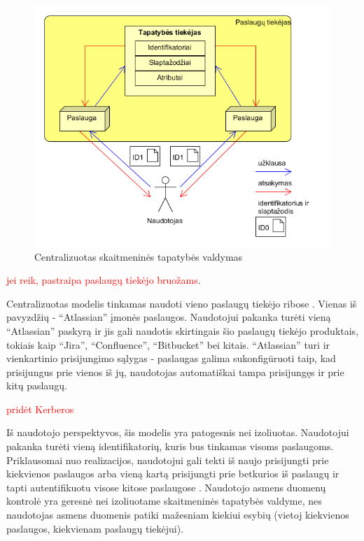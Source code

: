 \begin{figure}[H]
    \centering
    \includegraphics[scale=0.8]{img/centralizedModel}
    \caption{Centralizuotas skaitmeninės tapatybės valdymas \cite{Cao2010}}
    \label{fig:isolatedModel}
\end{figure}

\textcolor{red}{jei reik, pastraipa paslaugų tiekėjo bruožams}.


Centralizuotas modelis tinkamas naudoti vieno paslaugų tiekėjo ribose \cite{Josang2005}. Vienas iš pavyzdžių - 
\enquote{Atlassian} įmonės paslaugos. Naudotojui pakanka turėti vieną \enquote{Atlassian} paskyrą ir jis gali naudotis
skirtingais šio paslaugų tiekėjo produktais, tokiais kaip \enquote{Jira}, \enquote{Confluence}, \enquote{Bitbucket} bei kitais. \enquote{Atlassian}
turi ir vienkartinio prisijungimo sąlygas - paslaugas galima sukonfigūruoti taip, kad prisijungus prie vienos iš jų,
naudotojas automatiškai tampa prisijungęs ir prie kitų paslaugų.

\textcolor{red}{pridėt Kerberos}

 
Iš naudotojo perspektyvos, šis modelis yra patogesnis nei izoliuotas. Naudotojui pakanka turėti vieną identifikatorių,
kuris bus tinkamas visoms paslaugoms. Priklausomai nuo realizacijos, naudotojui gali tekti iš naujo prisijungti prie kiekvienos
paslaugos arba vieną kartą prisijungti prie betkurios iš paslaugų ir tapti autentifikuotu visose kitose paslaugose \cite{Josang2005}. Naudotojo asmens
duomenų kontrolė yra geresnė nei izoliuotame skaitmeninės tapatybės valdyme, nes naudotojas asmens duomenis patiki mažesniam kiekiui esybių
(vietoj kiekvienos paslaugos, kiekvienam paslaugų tiekėjui).


